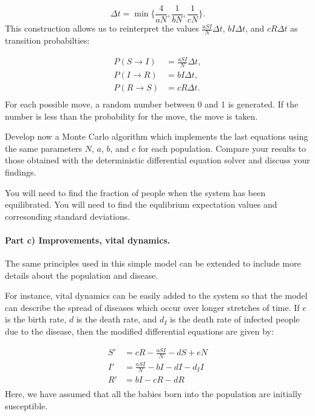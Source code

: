 \documentclass[%
oneside,                 %
final,                   %
10pt]{article}
\begin{document}
\begin{equation}
\Delta t = \min \Big\{ \frac{4}{aN}, \frac{1}{bN}, \frac{1}{cN} \Big\}.
\end{equation}
This construction allows us to reinterpret the values $\frac{aSI}{N}\Delta t$, $bI\Delta t$, and $cR\Delta t$ as transition probabilties:

\begin{equation}
\begin{split}
P(S\rightarrow I) &= \frac{aSI}{N}\Delta t,\\
P(I \rightarrow R) &= bI\Delta t,\\
P(R \rightarrow S) &= cR\Delta t.\\
\end{split}
\end{equation}
For each possible move, a random number between 0 and 1 is generated. If the number is less than the probability for the move, the move is taken.

Develop now a Monte Carlo algorithm which implements the last
equations using the same parameters $N$, $a$, $b$, and $c$ for each
population. Compare your results to those obtained with the
deterministic differential equation solver and discuss your findings. 

You will need to find the
fraction of people when the system has been equilibrated.  You will
need to find the equlibrium expectation values and corresonding
standard deviations.

\paragraph{Part c) Improvements, vital dynamics.}
The same principles used in this simple model can be extended to
include more details about the population and disease.  

For instance, vital dynamics can be easily added to the system so that
the model can describe the spread of diseases which occur over longer
stretches of time. If $e$ is the birth rate, $d$ is the death rate,
and $d_I$ is the death rate of infected people due to the disease,
then the modified differential equations are given by:

\begin{equation}
\begin{split}
S'&=cR-\frac{aSI}{N}-dS+eN\\
I'&=\frac{aSI}{N}-bI-dI-d_I I\\
R'&=bI-cR-dR\\
\end{split}
\end{equation}
Here, we have assumed that all the babies born into the population are initially susceptible. 
\end{document}
